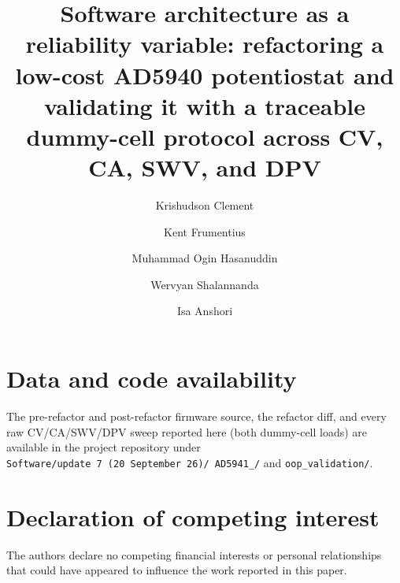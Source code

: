 \documentclass[preprint,12pt]{elsarticle}
\begin{document}
\begin{frontmatter}

\title{Software architecture as a reliability variable: refactoring a
low-cost {AD5940} potentiostat and validating it with a traceable
dummy-cell protocol across {CV}, {CA}, {SWV}, and {DPV}}

\author[itb]{Krishudson Clement}
\author[itb]{Kent Frumentius}
\author[itb,inha]{Muhammad Ogin Hasanuddin}
\author[itb]{Wervyan Shalannanda}
\author[itb]{Isa Anshori}




\end{frontmatter}








\section*{Data and code availability}
The pre-refactor and post-refactor firmware source, the refactor diff, and
every raw CV/CA/SWV/DPV sweep reported here (both dummy-cell loads) are
available in the project repository under
\texttt{Software/\allowbreak update~7~(20~September~26)/\allowbreak
AD5941\_/} and \texttt{oop\_\allowbreak validation/}.

\section*{Declaration of competing interest}
The authors declare no competing financial interests or personal relationships
that could have appeared to influence the work reported in this paper.



\end{document}

